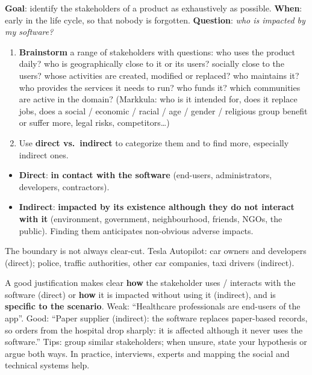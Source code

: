 \documentclass[11pt,a4paper,openany]{book}
\begin{document}
\begin{algbox}[title={Applying the strategy (cheat sheet 0.4)}]
\textbf{Goal}: identify the stakeholders of a product as exhaustively as possible.
\textbf{When}: early in the life cycle, so that nobody is forgotten.
\textbf{Question}: \emph{who is impacted by my software?}
\begin{enumerate}
  \item \textbf{Brainstorm} a range of stakeholders with questions:
        who uses the product daily? who is geographically close to it or its users? socially
        close to the users? whose activities are created, modified or replaced? who maintains
        it? who provides the services it needs to run? who funds it? which communities are
        active in the domain? (Markkula: who is it intended for, does it replace jobs, does a
        social / economic / racial / age / gender / religious group benefit or suffer more,
        legal risks, competitors\ldots)
  \item Use \textbf{direct vs.\ indirect} to categorize them and to find more, especially
        indirect ones.
\end{enumerate}
\end{algbox}

\begin{defnbox}[title={Direct vs.\ indirect stakeholders}]
\begin{itemize}
  \item \textbf{Direct}: \textbf{in contact with the software} (end-users, administrators,
        developers, contractors).
  \item \textbf{Indirect}: \textbf{impacted by its existence although they do not interact with
        it} (environment, government, neighbourhood, friends, NGOs, the public). Finding them
        anticipates non-obvious adverse impacts.
\end{itemize}
The boundary is not always clear-cut. Tesla Autopilot: car owners and developers (direct);
police, traffic authorities, other car companies, taxi drivers (indirect).
\end{defnbox}

\begin{keybox}[title={How the case studies are graded}]
A good justification makes clear \textbf{how} the stakeholder uses / interacts with the software
(direct) or \textbf{how} it is impacted without using it (indirect), and is \textbf{specific to
the scenario}. Weak: ``Healthcare professionals are end-users of the app''. Good: ``Paper
supplier (indirect): the software replaces paper-based records, so orders from the hospital
drop sharply: it is affected although it never uses the software.'' Tips: group similar
stakeholders; when unsure, state your hypothesis or argue both ways. In practice, interviews,
experts and mapping the social and technical systems help.
\end{keybox}
\end{document}
